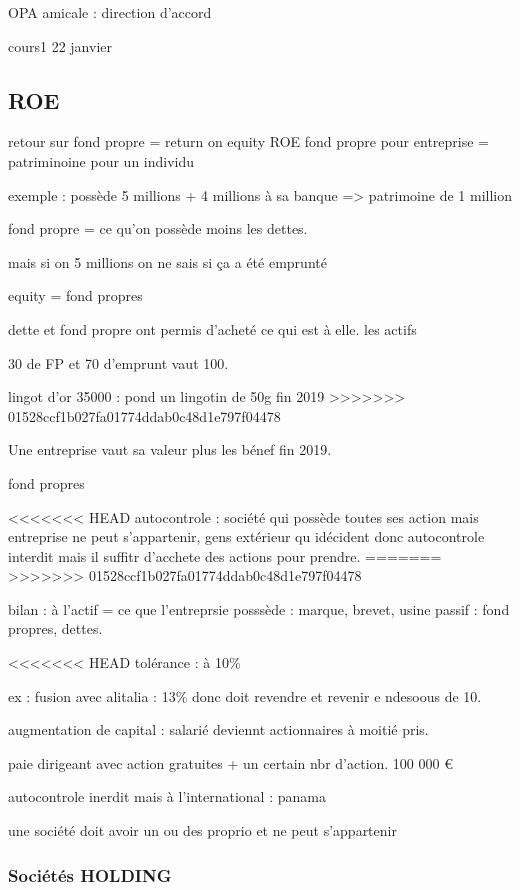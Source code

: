 \documentclass[a4paper,12pt]{article}
\begin{document}
OPA amicale : direction d'accord

cours1 22 janvier 


\subsection{ROE}
retour sur fond propre = return on equity ROE
fond propre pour entreprise = patriminoine pour un individu
 
exemple : possède  5 millions + 4 millions à sa banque
=> patrimoine de 1 million

fond propre = ce qu'on possède moins les dettes.

mais si on 5 millions on ne sais si ça a été emprunté

equity = fond propres

dette et fond propre ont permis d'acheté ce qui est à elle. les actifs

30 de FP et 70 d'emprunt vaut 100.

lingot d'or 35000 : pond un lingotin de 50g fin 2019
>>>>>>> 01528ccf1b027fa01774ddab0c48d1e797f04478

Une entreprise vaut sa valeur plus les bénef fin 2019.

fond propres

<<<<<<< HEAD
autocontrole : société qui possède toutes ses action
mais entreprise ne peut s'appartenir, gens extérieur qu idécident
donc autocontrole interdit mais il suffitr d'acchete des actions pour prendre.
=======
>>>>>>> 01528ccf1b027fa01774ddab0c48d1e797f04478

bilan : à l'actif = ce que l'entreprsie posssède : marque, brevet, usine
passif : fond propres, dettes.

<<<<<<< HEAD
tolérance : à 10\%

ex : fusion avec alitalia : 13\%  donc doit revendre et revenir e ndesoous de 10.

augmentation de capital : salarié deviennt actionnaires à moitié pris.

paie dirigeant avec action gratuites + un certain nbr d'action.
100 000 €

autocontrole inerdit mais à l'international : panama

une société doit avoir un ou des proprio et ne peut s'appartenir 

\subsubsection{Sociétés HOLDING} 
\end{document}
